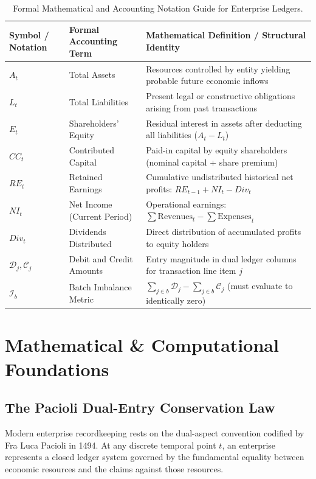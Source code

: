 \begin{table}[htbp]
\centering
\small
\begin{tabularx}{\textwidth}{llX}
\toprule
\textbf{Symbol / Notation} & \textbf{Formal Accounting Term} & \textbf{Mathematical Definition / Structural Identity} \\
\midrule
$A_t$ & Total Assets & Resources controlled by entity yielding probable future economic inflows \\
$L_t$ & Total Liabilities & Present legal or constructive obligations arising from past transactions \\
$E_t$ & Shareholders' Equity & Residual interest in assets after deducting all liabilities ($A_t - L_t$) \\
$CC_t$ & Contributed Capital & Paid-in capital by equity shareholders (nominal capital + share premium) \\
$RE_t$ & Retained Earnings & Cumulative undistributed historical net profits: $RE_{t-1} + NI_t - Div_t$ \\
$NI_t$ & Net Income (Current Period) & Operational earnings: $\sum \text{Revenues}_t - \sum \text{Expenses}_t$ \\
$Div_t$ & Dividends Distributed & Direct distribution of accumulated profits to equity holders \\
$\mathcal{D}_j, \mathcal{C}_j$ & Debit and Credit Amounts & Entry magnitude in dual ledger columns for transaction line item $j$ \\
$\mathcal{I}_b$ & Batch Imbalance Metric & $\sum_{j \in b} \mathcal{D}_j - \sum_{j \in b} \mathcal{C}_j$ (must evaluate to identically zero) \\
\bottomrule
\end{tabularx}
\caption{Formal Mathematical and Accounting Notation Guide for Enterprise Ledgers.}
\label{tab:w1_notation}
\end{table}

\section{Mathematical \& Computational Foundations}

\subsection{The Pacioli Dual-Entry Conservation Law}
Modern enterprise recordkeeping rests on the dual-aspect convention codified by Fra Luca Pacioli in 1494. At any discrete temporal point $t$, an enterprise represents a closed ledger system governed by the fundamental equality between economic resources and the claims against those resources.


